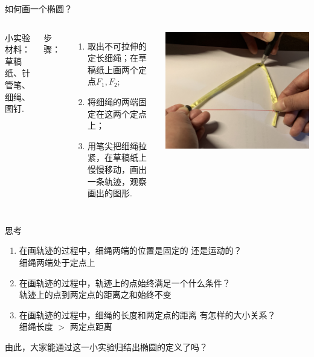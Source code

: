 \documentclass{beamer}
\begin{document}
    \begin{frame}{\qquad 如何画一个椭圆？}
      \begin{columns}
        小实验材料：\\ 草稿纸、针管笔、细绳、图钉. \pause \vspace{15pt}

        步骤：\pause
        \begin{enumerate}
          \item 取出不可拉伸的定长细绳；在草稿纸上画两个定点$F_1, F_2$;\pause
          \item 将细绳的两端固定在这两个定点上；\pause
          \item 用笔尖把细绳拉紧，在草稿纸上慢慢移动，画出一条轨迹，观察画出的图形. \pause
        \end{enumerate}

          \includegraphics[scale=0.04]{e3.jpg}
      \end{columns}

    \end{frame}

    \begin{frame}
      \begin{block}{思考}
        \begin{enumerate}
          \item 在画轨迹的过程中，细绳两端的位置是固定的 还是运动的？\pause \\ \alert{细绳两端处于定点上} \pause
          \item 在画轨迹的过程中，轨迹上的点始终满足一个什么条件？
        \pause \\ \alert{轨迹上的点到两定点的距离之和始终不变} \pause
          \item 在画轨迹的过程中，细绳的长度和两定点的距离 有怎样的大小关系？\\ \alert{细绳长度 $>$ 两定点距离}
        \end{enumerate}
      \end{block}\pause
      由此，大家能通过这一小实验归结出\textcolor{rh}{椭圆的定义}了吗？
    \end{frame}
\end{document}
